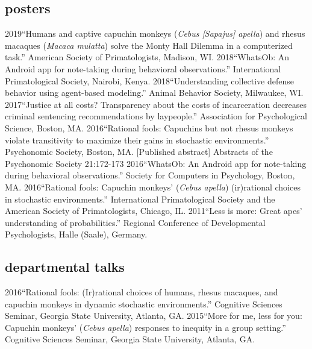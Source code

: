 \documentclass[]{friggeri-cv}
\begin{document}

\subsection{posters}

\begin{entrylist2}
  \entrytwo
    {2019}{``Humans and captive capuchin monkeys (\emph{Cebus [Sapajus] apella}) and rhesus macaques (\emph{Macaca mulatta}) solve the Monty Hall Dilemma in a computerized task.'' American Society of Primatologists, Madison, WI.}
  \entrytwo
    {2018}{``WhatsOb: An Android app for note-taking during behavioral observations.'' International Primatological Society, Nairobi, Kenya.}
  \entrytwo
    {2018}{``Understanding collective defense behavior using agent-based modeling.'' Animal Behavior Society, Milwaukee, WI.}
  \entrytwo
    {2017}{``Justice at all costs? Transparency about the costs of incarceration decreases criminal sentencing recommendations by laypeople.'' Association for Psychological Science, Boston, MA.}
\entrytwo
    {2016}{``Rational fools: Capuchins but not rhesus monkeys violate transitivity to maximize their gains in stochastic environments.'' Psychonomic Society, Boston, MA. [Published abstract] Abstracts of the Psychonomic Society 21:172-173}
  \entrytwo
    {2016}{``WhatsOb: An Android app for note-taking during behavioral observations.'' Society for Computers in Psychology, Boston, MA.}
  \entrytwo
    {2016}{``Rational fools: Capuchin monkeys' (\emph{Cebus apella}) (ir)rational choices in stochastic environments.'' International Primatological Society and the American Society of Primatologists, Chicago, IL.}
  \entrytwo
    {2011}{``Less is more: Great apes' understanding of probabilities.'' Regional Conference of Developmental Psychologists, Halle (Saale), Germany.}
\end{entrylist2}


\newpage


\subsection{departmental talks}

\begin{entrylist2}
  \entrytwo
    {2016}{``Rational fools: (Ir)rational choices of humans, rhesus macaques, and capuchin monkeys in dynamic stochastic environments.'' Cognitive Sciences Seminar, Georgia State University, Atlanta, GA.}
  \entrytwo
    {2015}{``More for me, less for you: Capuchin monkeys' (\emph{Cebus apella}) responses to inequity in a group setting.'' Cognitive Sciences Seminar, Georgia State University, Atlanta, GA.}
\end{entrylist2}
\end{document}
